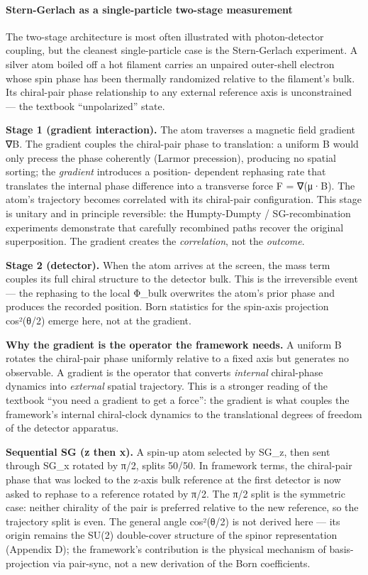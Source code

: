 \documentclass[
]{article}
\begin{document}
\paragraph{Stern-Gerlach as a single-particle two-stage
measurement}\label{stern-gerlach-as-a-single-particle-two-stage-measurement}

The two-stage architecture is most often illustrated with
photon-detector coupling, but the cleanest single-particle case is the
Stern-Gerlach experiment. A silver atom boiled off a hot filament
carries an unpaired outer-shell electron whose spin phase has been
thermally randomized relative to the filament's bulk. Its chiral-pair
phase relationship to any external reference axis is unconstrained ---
the textbook ``unpolarized'' state.

\textbf{Stage 1 (gradient interaction).} The atom traverses a magnetic
field gradient ∇B. The gradient couples the chiral-pair phase to
translation: a uniform B would only precess the phase coherently (Larmor
precession), producing no spatial sorting; the \emph{gradient}
introduces a position- dependent rephasing rate that translates the
internal phase difference into a transverse force F = ∇(μ·B). The atom's
trajectory becomes correlated with its chiral-pair configuration. This
stage is unitary and in principle reversible: the Humpty-Dumpty /
SG-recombination experiments demonstrate that carefully recombined paths
recover the original superposition. The gradient creates the
\emph{correlation}, not the \emph{outcome}.

\textbf{Stage 2 (detector).} When the atom arrives at the screen, the
mass term couples its full chiral structure to the detector bulk. This
is the irreversible event --- the rephasing to the local Φ\_bulk
overwrites the atom's prior phase and produces the recorded position.
Born statistics for the spin-axis projection cos²(θ/2) emerge here, not
at the gradient.

\textbf{Why the gradient is the operator the framework needs.} A uniform
B rotates the chiral-pair phase uniformly relative to a fixed axis but
generates no observable. A gradient is the operator that converts
\emph{internal} chiral-phase dynamics into \emph{external} spatial
trajectory. This is a stronger reading of the textbook ``you need a
gradient to get a force'': the gradient is what couples the framework's
internal chiral-clock dynamics to the translational degrees of freedom
of the detector apparatus.

\textbf{Sequential SG (z then x).} A spin-up atom selected by SG\_z,
then sent through SG\_x rotated by π/2, splits 50/50. In framework
terms, the chiral-pair phase that was locked to the z-axis bulk
reference at the first detector is now asked to rephase to a reference
rotated by π/2. The π/2 split is the symmetric case: neither chirality
of the pair is preferred relative to the new reference, so the
trajectory split is even. The general angle cos²(θ/2) is not derived
here --- its origin remains the SU(2) double-cover structure of the
spinor representation (Appendix D); the framework's contribution is the
physical mechanism of basis-projection via pair-sync, not a new
derivation of the Born coefficients.
\end{document}
